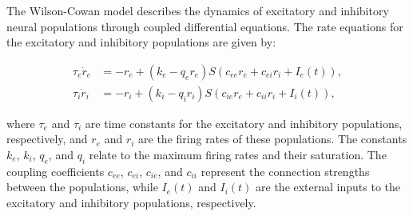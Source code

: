 \documentclass[12pt]{article}
\begin{document}

The Wilson-Cowan model describes the dynamics of excitatory and inhibitory neural populations through coupled differential equations. The rate equations for the excitatory and inhibitory populations are given by:

\[
\begin{aligned}
\tau_e \dot{r}_e &= -r_e + (k_e - q_e r_e) S(c_{ee} r_e + c_{ei} r_i + I_e(t)), \\
\tau_i \dot{r}_i &= -r_i + (k_i - q_i r_i) S(c_{ie} r_e + c_{ii} r_i + I_i(t)),
\end{aligned}
\]

where \( \tau_e \) and \( \tau_i \) are time constants for the excitatory and inhibitory populations, respectively, and \( r_e \) and \( r_i \) are the firing rates of these populations. The constants \( k_e \), \( k_i \), \( q_e \), and \( q_i \) relate to the maximum firing rates and their saturation. The coupling coefficients \( c_{ee} \), \( c_{ei} \), \( c_{ie} \), and \( c_{ii} \) represent the connection strengths between the populations, while \( I_e(t) \) and \( I_i(t) \) are the external inputs to the excitatory and inhibitory populations, respectively.
\end{document}
